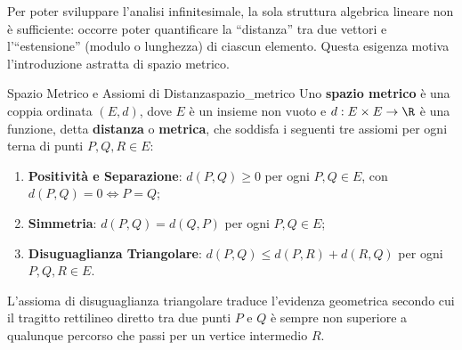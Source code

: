 Per poter sviluppare l'analisi infinitesimale, la sola struttura algebrica lineare non è sufficiente: occorre poter quantificare la ``distanza'' tra due vettori e l'``estensione'' (modulo o lunghezza) di ciascun elemento. Questa esigenza motiva l'introduzione astratta di spazio metrico.

\begin{definizione}{Spazio Metrico e Assiomi di Distanza}{spazio_metrico}
Uno \textbf{spazio metrico} è una coppia ordinata $(E, d)$, dove $E$ è un insieme non vuoto e $d: E \times E \to \R$ è una funzione, detta \textbf{distanza} o \textbf{metrica}, che soddisfa i seguenti tre assiomi per ogni terna di punti $P, Q, R \in E$:
\begin{enumerate}
    \item \textbf{Positività e Separazione}: $d(P, Q) \ge 0$ per ogni $P, Q \in E$, con $d(P, Q) = 0 \iff P = Q$;
    \item \textbf{Simmetria}: $d(P, Q) = d(Q, P)$ per ogni $P, Q \in E$;
    \item \textbf{Disuguaglianza Triangolare}: $d(P, Q) \le d(P, R) + d(R, Q)$ per ogni $P, Q, R \in E$.
\end{enumerate}
\end{definizione}

L'assioma di disuguaglianza triangolare traduce l'evidenza geometrica secondo cui il tragitto rettilineo diretto tra due punti $P$ e $Q$ è sempre non superiore a qualunque percorso che passi per un vertice intermedio $R$.

\begin{center}
\end{center}

